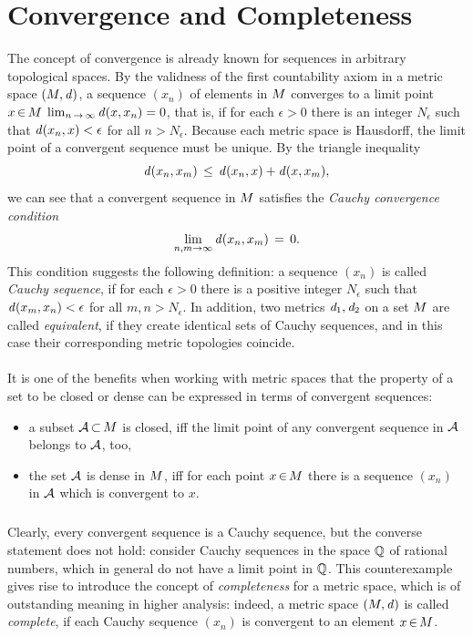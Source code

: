 \documentclass[11pt,twoside]{article}
\begin{document}
\section{Convergence and Completeness}                                         %
The concept of convergence is already known
for sequences in arbitrary topological spaces.
By the validness of the first countability axiom
in a metric space $(M,\mathit{d})$,
a sequence $(x_n)$ of elements in $M$ converges to
a limit point $x {\,\in\,} M$ \iff $\lim_{n {\,\to\,} \infty} \mathit{d}(x,x_n)=0$,
that is,
if for each $\epsilon > 0$ there is an integer $N_{\epsilon}$
such that $\mathit{d}(x_n, x) < \epsilon$ for all $n > N_{\epsilon}$.
Because each metric space is Hausdorff,
the limit point of a convergent sequence must be unique.
By the triangle inequality
\[
\mathit{d}(x_n,x_m) \, \leq \, \mathit{d}(x_n,x) + \mathit{d}(x,x_m),
\]
we can see that a convergent sequence in $M$ satisfies the
\textit{Cauchy convergence condition}
\[
\lim_{n,m \to \infty} \mathit{d}(x_n,x_m) \,=\, 0.
\]
This condition suggests the following definition:
a sequence $(x_n)$ is called \textit{Cauchy sequence},
if for each $\epsilon > 0$ there is a positive integer $N_{\epsilon}$
such that $\mathit{d}(x_m, x_n) < \epsilon$ for all $m,n > N_{\epsilon}$.
In addition,
two metrics $\mathit{d}_1,\mathit{d}_2$ on a set $M$ are called \textit{equivalent},
if they create identical sets of Cauchy sequences,
and in this case their corresponding metric topologies coincide.

\paragraph{}
It is one of the benefits when working with metric spaces
that the property of a set to be closed or dense can be expressed
in terms of convergent sequences:

\begin{itemize}[leftmargin=12pt,itemsep=1pt]
\item[1.]
a subset $\mathcal{A} {\,\subset\,} M$ is closed,
iff the limit point of any convergent sequence in $\mathcal{A}$ belongs to $\mathcal{A}$,
too,

\item[2.]
the set $\mathcal{A}$ is dense in $M$,
iff for each point $x {\,\in\,} M$ there is a sequence $(x_n)$
in $\mathcal{A}$ which is convergent to $x$.
\end{itemize}

\subparagraph{}
Clearly,
every convergent sequence is a Cauchy sequence,
but the converse statement does not hold:
consider Cauchy sequences in the space ${\mathbb{Q}}$ of rational numbers,
which in general do not have a limit point in ${\mathbb{Q}}$.
This counterexample gives rise to introduce the concept
of \textit{completeness} for a metric space,
which is of outstanding meaning in higher analysis:
indeed,
a metric space $(M,\mathit{d})$ is called \textit{complete},
if each Cauchy sequence $(x_n)$ is convergent to an element $x {\,\in\,} M$.
\end{document}
